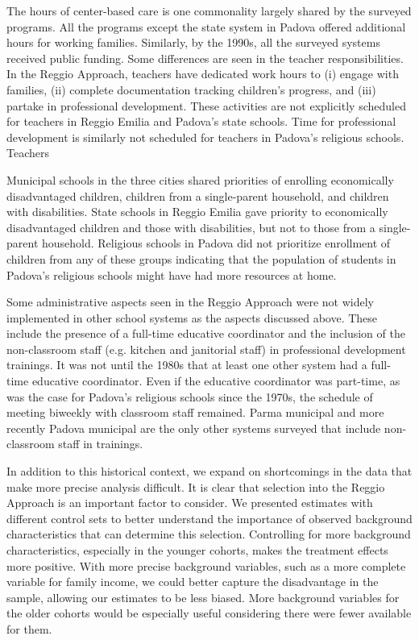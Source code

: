 The hours of center-based care is one commonality largely shared by the surveyed programs. All the programs except the state system in Padova offered additional hours for working families. Similarly, by the 1990s, all the surveyed systems received public funding. Some differences are seen in the teacher responsibilities. In the Reggio Approach, teachers have dedicated work hours to (i) engage with families, (ii) complete documentation tracking children's progress, and (iii) partake in professional development. These activities are not explicitly scheduled for teachers in Reggio Emilia and Padova's state schools. Time for professional development is similarly not scheduled for teachers in Padova's religious schools. Teachers

Municipal schools in the three cities shared priorities of enrolling economically disadvantaged children, children from a single-parent household, and children with disabilities. State schools in Reggio Emilia gave priority to economically disadvantaged children and those with disabilities, but not to those from a single-parent household. Religious schools in Padova did not prioritize enrollment of children from any of these groups indicating that the population of students in Padova's religious schools might have had more resources at home. %

Some administrative aspects seen in the Reggio Approach were not widely implemented in other school systems as the aspects discussed above. These include the presence of a full-time educative coordinator and the inclusion of the non-classroom staff (e.g. kitchen and janitorial staff) in professional development trainings. It was not until the 1980s that at least one other system had a full-time educative coordinator. Even if the educative coordinator was part-time, as was the case for Padova's religious schools since the 1970s, the schedule of meeting biweekly with classroom staff remained. Parma municipal and more recently Padova municipal are the only other systems surveyed that include non-classroom staff in trainings.



In addition to this historical context, we expand on shortcomings in the data that make more precise analysis difficult. It is clear that selection into the Reggio Approach is an important factor to consider. We presented estimates with different control sets to better understand the importance of observed background characteristics that can determine this selection. Controlling for more background characteristics, especially in the younger cohorts, makes the treatment effects more positive. With more precise background variables, such as a more complete variable for family income, we could better capture the disadvantage in the sample, allowing our estimates to be less biased. More background variables for the older cohorts would be especially useful considering there were fewer available for them.

